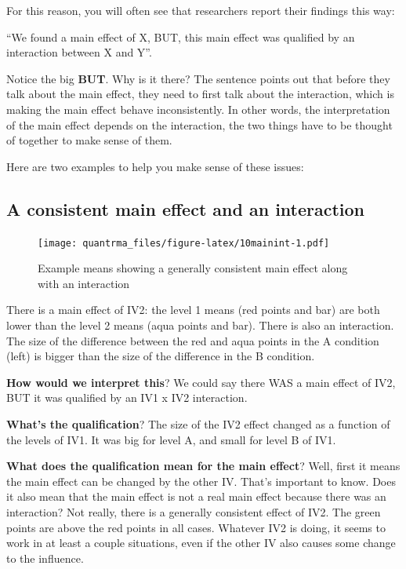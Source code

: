 \documentclass[
]{book}
\begin{document}
For this reason, you will often see that researchers report their findings this way:

``We found a main effect of X, BUT, this main effect was qualified by an interaction between X and Y''.

Notice the big \textbf{BUT}. Why is it there? The sentence points out that before they talk about the main effect, they need to first talk about the interaction, which is making the main effect behave inconsistently. In other words, the interpretation of the main effect depends on the interaction, the two things have to be thought of together to make sense of them.

Here are two examples to help you make sense of these issues:

\hypertarget{a-consistent-main-effect-and-an-interaction}{%
\subsection{A consistent main effect and an interaction}\label{a-consistent-main-effect-and-an-interaction}}

\begin{figure}
\centering
\texttt{[image: quantrma\_files/figure-latex/10mainint-1.pdf]}
\caption{\label{fig:10mainint}Example means showing a generally consistent main effect along with an interaction}
\end{figure}

There is a main effect of IV2: the level 1 means (red points and bar) are both lower than the level 2 means (aqua points and bar). There is also an interaction. The size of the difference between the red and aqua points in the A condition (left) is bigger than the size of the difference in the B condition.

\textbf{How would we interpret this}? We could say there WAS a main effect of IV2, BUT it was qualified by an IV1 x IV2 interaction.

\textbf{What's the qualification}? The size of the IV2 effect changed as a function of the levels of IV1. It was big for level A, and small for level B of IV1.

\textbf{What does the qualification mean for the main effect}? Well, first it means the main effect can be changed by the other IV. That's important to know. Does it also mean that the main effect is not a real main effect because there was an interaction? Not really, there is a generally consistent effect of IV2. The green points are above the red points in all cases. Whatever IV2 is doing, it seems to work in at least a couple situations, even if the other IV also causes some change to the influence.
\end{document}
